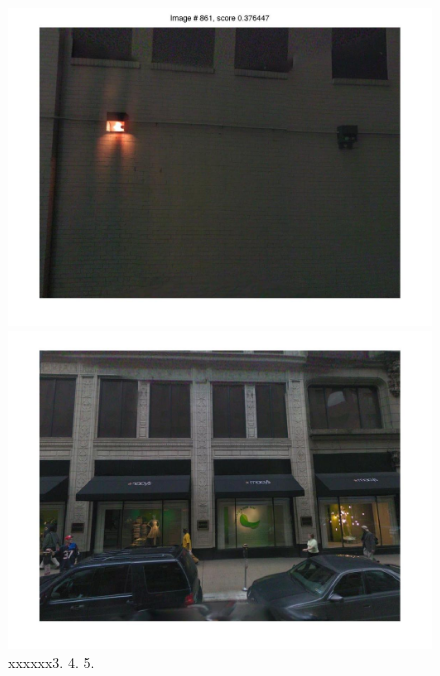 \documentclass[10pt,onecolumn,A4]{article}
\begin{document}
\begin{figure}
\begin{minipage}{0.45\linewidth}
		\colorbox{myCopper4}{\includegraphics[trim = 55mm 40mm 55mm 30mm, clip=true,width=0.30\linewidth]{sup1957/svm04.jpg}}
		\colorbox{myCopper5}{\includegraphics[trim = 55mm 40mm 55mm 30mm, clip=true,width=0.30\linewidth]{sup1957/svm05.jpg}}  \\
		\textcolor{myWhite}{xxxxxx}3. \hspace{0.25\linewidth}4. \hspace{0.25\linewidth}5. \\
	\end{minipage}
\end{figure}
\end{document}
